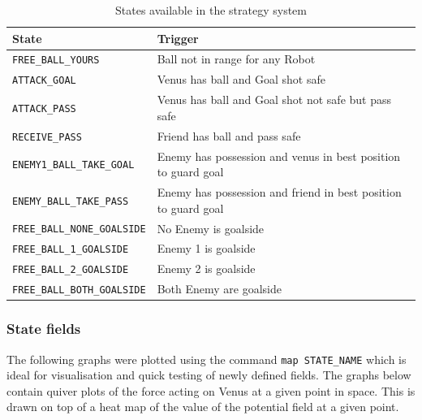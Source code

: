 \documentclass[a4paper,12pt]{article}
\begin{document}
\begin{table}[h!]
\centering
\begin{tabular}{ | l | l | }
\hline
\textbf{State} & \textbf{Trigger} \\ \hline
\texttt{FREE\_BALL\_YOURS} & Ball not in range for any Robot\\ \hline
\texttt{ATTACK\_GOAL} &   Venus has ball and Goal shot safe \\ \hline
\texttt{ATTACK\_PASS} &  Venus has ball and Goal shot not safe but pass safe\\ \hline
\texttt{RECEIVE\_PASS} &  Friend has ball and pass safe\\ \hline
\texttt{ENEMY1\_BALL\_TAKE\_GOAL} &  Enemy has possession and venus in best position to guard goal\\ \hline
\texttt{ENEMY\_BALL\_TAKE\_PASS} &  Enemy has possession and friend in best position to guard goal\\ \hline
\texttt{FREE\_BALL\_NONE\_GOALSIDE} & No Enemy is goalside \\ \hline
\texttt{FREE\_BALL\_1\_GOALSIDE} & Enemy 1 is goalside \\ \hline
\texttt{FREE\_BALL\_2\_GOALSIDE} & Enemy 2 is goalside \\ \hline
\texttt{FREE\_BALL\_BOTH\_GOALSIDE} &  Both Enemy are goalside\\ \hline

\end{tabular}
\caption{States available in the strategy system}
\label{tab:machine}
\end{table}

\subsubsection{State fields}

The following graphs were plotted using the command \texttt{map STATE\_NAME} which is ideal for visualisation and quick testing of newly defined fields. The graphs below contain quiver plots of the force acting on Venus at a given point in space. This is drawn on top of a heat map of the value of the potential field at a given point. 
\end{document}
